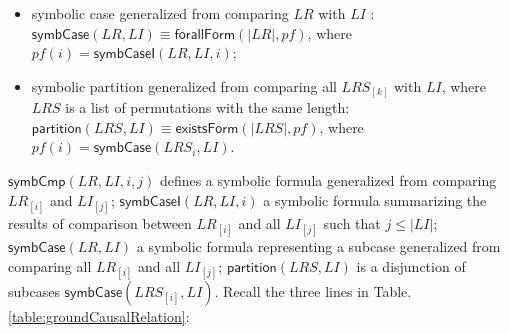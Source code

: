 \documentclass[conference]{IEEEtran}
\def \iInv {i}
\def \iR {iR}
\begin{document}
{\begin{definition}
\begin{itemize}[leftmargin=8pt,noitemsep,nolistsep]
\item symbolic case  generalized from comparing $LR$ with $LI$ : $\mathsf{symbCase}(LR,LI )\equiv \mathsf{forallForm}(|LR|,pf)$, where $pf(i)= \mathsf{symbCaseI}(LR,LI,i )$;

\item symbolic partition generalized from comparing all $LRS_{[k]}$ with $LI$, where $LRS$ is a list of permutations with the same length: $\mathsf{partition}(LRS,LI) \equiv \mathsf{existsForm}(|LRS|,pf)$,  where $pf(i)= \mathsf{symbCase}(LRS_i,LI)$.

\end{itemize}
\end{definition}
\vspace{-5pt}
$\mathsf{symbCmp}(LR,LI,i,j)$ defines a symbolic formula  generalized from comparing $LR_{[i]}$ and $LI_{[j]}$; $\mathsf{symbCaseI}(LR,LI,i)$  a symbolic formula summarizing the results of comparison  between $LR_{[i]}$  and all $LI_{[j]}$ such that $j \le |LI|$; $\mathsf{symbCase}(LR,LI )$ a symbolic formula representing a subcase generalized from comparing all $LR_{[i]}$  and all $LI_{[j]}$; $\mathsf{partition}(LRS,LI)$  is a disjunction of subcases $\mathsf{symbCase}(LRS_{[i]},LI )$.  Recall the   three lines in Table. \ref{table:groundCausalRelation}:%


\begin{itemize}[leftmargin=8pt,noitemsep,nolistsep]


\end{itemize}}
\end{document}
